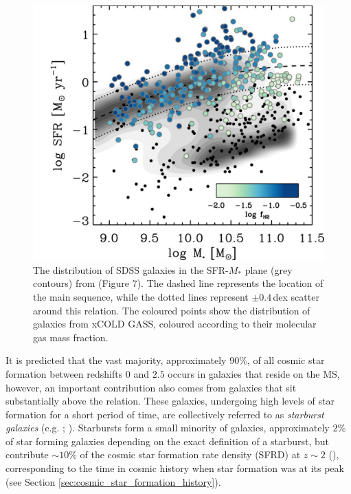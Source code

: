 \begin{figure}
    \centering
	\includegraphics[width=0.75\columnwidth]{Figures/saintonge_ms.pdf}
	\caption[The distribution of SDSS galaxies in the SFR-$M_*$ plane]{The distribution of SDSS galaxies in the SFR-$M_*$ plane (grey contours) from \citealt{Saintonge_2017} (Figure 7). The dashed line represents the location of the main sequence, while the dotted lines represent $\pm0.4\,$dex scatter around this relation. The coloured points show the distribution of galaxies from xCOLD GASS, coloured according to their molecular gas mass fraction.}
	\label{fig:star_forming_main_sequence}
\end{figure}

It is predicted that the vast majority, approximately $90\%$, of all cosmic star formation between redshifts $0$ and $2.5$ occurs in galaxies that reside on the MS, however, an important contribution also comes from galaxies that sit substantially above the relation. These galaxies, undergoing high levels of star formation for a short period of time, are collectively referred to as \textit{starburst galaxies} (e.g. \citealt{Muxlow_2006}; \citealt{Rinaldi_2022}). Starbursts form a small minority of galaxies, approximately $2\%$ of star forming galaxies depending on the exact definition of a starburst, but contribute $\sim 10\%$ of the cosmic star formation rate density (SFRD) at $z \sim 2$ (\citealt{Rodighiero_2011}), corresponding to the time in cosmic history when star formation was at its peak (see Section \ref{sec:cosmic_star_formation_history}).

